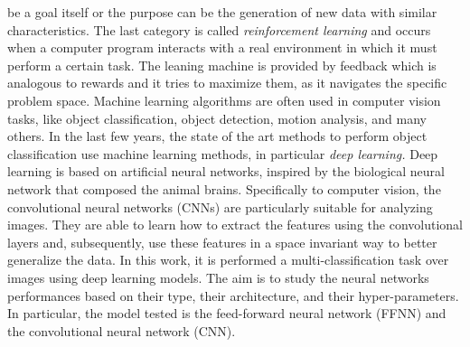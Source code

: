 be a goal itself or the purpose can be the generation of new data with
similar characteristics. The last category is called \emph{reinforcement
learning} and occurs when a computer program interacts with a real
environment in which it must perform a certain task. The leaning machine
is provided by feedback which is analogous to rewards and it tries to
maximize them, as it navigates the specific problem space. Machine
learning algorithms are often used in computer vision tasks, like object
classification, object detection, motion analysis, and many others. In
the last few years, the state of the art methods to perform object
classification use machine learning methods, in particular \emph{deep learning.}
Deep learning is based on artificial neural networks, inspired by the
biological neural network that composed the animal brains. Specifically
to computer vision, the convolutional neural networks (CNNs) are
particularly suitable for analyzing images. They are able to learn how
to extract the features using the convolutional layers and,
subsequently, use these features in a space invariant way to better
generalize the data. In this work, it is performed a
multi-classification task over images using deep
learning models. The aim is to study the neural networks performances
based on their type, their architecture, and their hyper-parameters. In
particular, the model tested is the feed-forward neural network (FFNN)
and the convolutional neural network (CNN).
